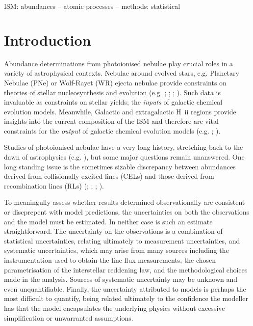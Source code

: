 \documentclass[useAMS,usenatbib]{mn2e}
\begin{document}
\begin{keywords}
ISM: abundances -- atomic processes -- methods: statistical
\end{keywords}

\section{Introduction}

Abundance determinations from photoionised nebulae play crucial roles in a variety of astrophysical contexts. Nebulae around evolved stars, e.g. Planetary Nebulae (PNe) or Wolf-Rayet (WR) ejecta nebulae provide constraints on theories of stellar nucleosynthesis and evolution (e.g. \citealt{2009ApJ...690.1130K};  \citealt{2011arXiv1110.1186M}; \citealt{1992A&A...264..105M}; \citealt{2011MNRAS.tmp.1754S}). Such data is invaluable as constraints on stellar yields; the \textit{inputs} of galactic chemical evolution models. Meanwhile, Galactic and extragalactic H~{\sc ii} regions provide insights into the current composition of the ISM and therefore are vital constraints for the \textit{output} of galactic chemical evolution models (e.g. \citealt{1997nceg.book.....P}; \citealt{2003ceg..book.....M}).

Studies of photoionised nebulae have a very long history, stretching back to the dawn of astrophysics (e.g. \citep{1864RSPT..154..437H}), but some major questions remain unanswered.  One long standing issue is the sometimes sizable discrepancy between abundances derived from collisionally excited lines (CELs) and those derived from recombination lines (RLs) (\citealt{2005MNRAS.362..424W}; \citet{2006MNRAS.368.1959L}; \citealt{2007ApJ...670..457G}; \citealt{2008MNRAS.386...22T}).

To meaningully assess whether results determined observationally are consistent or discprepent with model predictions, the uncertainties on both the observations and the model must be estimated.  In neither case is such an estimate straightforward.  The uncertainty on the observations is a combination of statistical uncertainties, relating ultimately to measurement uncertainties, and systematic uncertainties, which may arise from many sources including the instrumentation used to obtain the line flux measurements, the chosen parametrisation of the interstellar reddening law, and the methodological choices made in the analysis.  Sources of systematic uncertainty may be unknown and even unquantifiable.  Finally, the uncertainty attributed to models is perhaps the most difficult to quantify, being related ultimately to the confidence the modeller has that the model encapsulates the underlying physics without excessive simplification or unwarranted assumptions.
\end{document}
